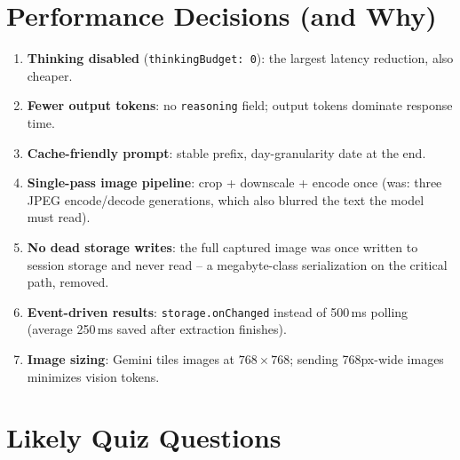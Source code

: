 \documentclass[11pt]{article}
\begin{document}
\section{Performance Decisions (and Why)}

\begin{enumerate}
  \item \textbf{Thinking disabled} (\texttt{thinkingBudget: 0}): the largest
        latency reduction, also cheaper.
  \item \textbf{Fewer output tokens}: no \texttt{reasoning} field; output
        tokens dominate response time.
  \item \textbf{Cache-friendly prompt}: stable prefix, day-granularity date
        at the end.
  \item \textbf{Single-pass image pipeline}: crop + downscale + encode once
        (was: three JPEG encode/decode generations, which also blurred the
        text the model must read).
  \item \textbf{No dead storage writes}: the full captured image was once
        written to session storage and never read -- a megabyte-class
        serialization on the critical path, removed.
  \item \textbf{Event-driven results}: \texttt{storage.onChanged} instead of
        500\,ms polling (average 250\,ms saved after extraction finishes).
  \item \textbf{Image sizing}: Gemini tiles images at $768\times768$; sending
        768px-wide images minimizes vision tokens.
\end{enumerate}

\section{Likely Quiz Questions}
\end{document}
